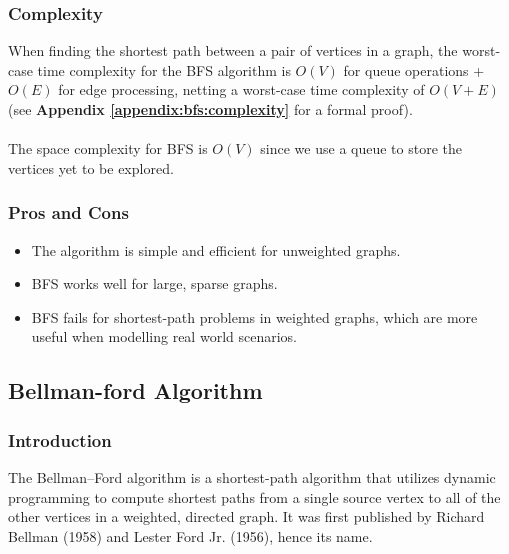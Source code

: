 		\subsubsection{Complexity}
			When finding the shortest path between a pair of vertices in a graph, the worst-case time complexity for the BFS algorithm is $O(V)$ for queue operations + $O(E)$ for edge processing, netting a worst-case time complexity of $O(V + E)$ (see \textbf{Appendix \ref{appendix:bfs:complexity}} for a formal proof). \\ \\
			The space complexity for BFS is $O(V)$ since we use a queue to store the vertices yet to be explored.
		
		\subsubsection{Pros and Cons}
			\begin{itemize}
				\item The algorithm is simple and efficient for unweighted graphs.
				\item BFS works well for large, sparse graphs.
				\item BFS fails for shortest-path problems in weighted graphs, which are more useful when modelling real world scenarios.
			\end{itemize}
	\subsection{Bellman-ford Algorithm}
		\subsubsection{Introduction}
			The Bellman–Ford algorithm is a shortest-path algorithm that utilizes dynamic programming to compute shortest paths from a single source vertex to all of the other vertices in a weighted, directed graph. It was first published by Richard Bellman (1958) and Lester Ford Jr. (1956), hence its name.

